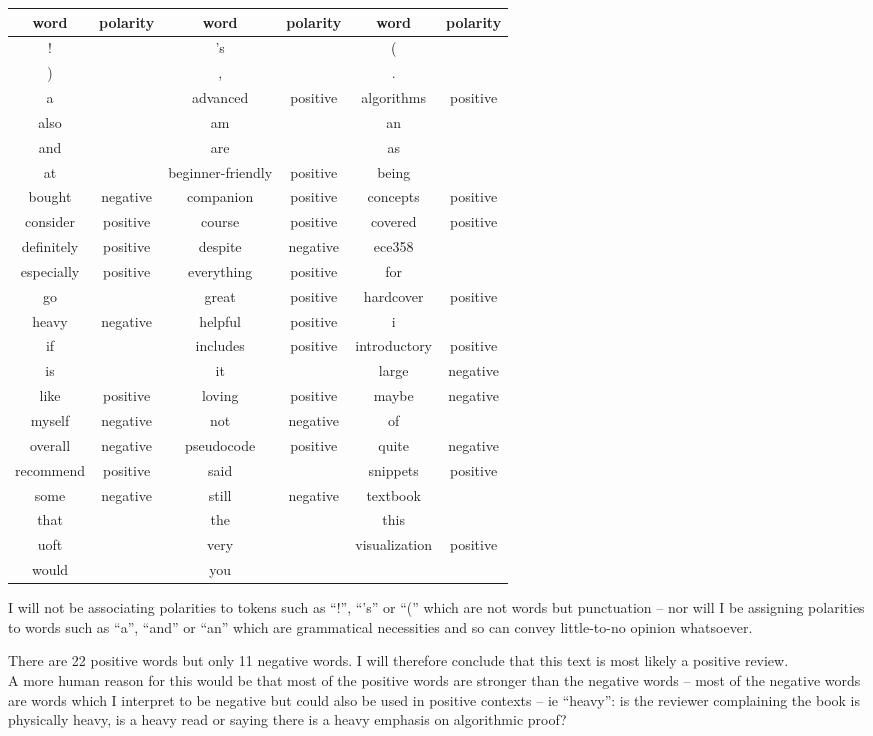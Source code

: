 \documentclass[10pt,\jkfside,a4paper]{article}
\begin{document}
\begin{enumerate}
\begin{tabular}{c c|c c|c c}
word & polarity & word & polarity & word & polarity\\
\hline
! &  & 's &  & ( & \\
) &  & , &  & . & \\
a &  & advanced & positive & algorithms & positive\\
also &  & am &  & an & \\
and &  & are &  & as & \\
at &  & beginner-friendly & positive & being & \\
bought & negative & companion & positive & concepts & positive\\
consider & positive & course & positive & covered & positive\\
definitely & positive & despite & negative & ece358 & \\
especially & positive & everything & positive & for & \\
go &  & great & positive & hardcover & positive\\
heavy & negative & helpful & positive & i & \\
if &  & includes & positive & introductory & positive\\
is &  & it &  & large & negative\\
like & positive & loving & positive & maybe & negative\\
myself & negative & not & negative & of & \\
overall & negative & pseudocode & positive & quite & negative\\
recommend & positive & said &  & snippets & positive\\
some & negative & still & negative & textbook & \\
that &  & the &  & this & \\
uoft &  & very &  & visualization & positive\\
would &  & you &  &  & \\
\end{tabular}

I will not be associating polarities to tokens such as ``!'', ``'s'' or ``('' which are not words but 
punctuation -- nor will I be assigning polarities to words such as ``a'', ``and'' or ``an'' which are 
grammatical necessities and so can convey little-to-no opinion whatsoever.

There are 22 positive words but only 11 negative words. I will therefore conclude that this text is most 
likely a positive review. \\
A more human reason for this would be that most of the positive words are stronger than the negative words -- 
most of the negative words are words which I interpret to be negative but could also be used in positive 
contexts -- ie ``heavy'': is the reviewer complaining the book is physically heavy, is a heavy read or 
saying there is a heavy emphasis on algorithmic proof?


\end{enumerate}
\end{document}
